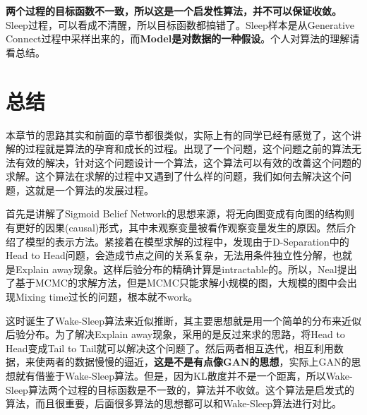 \documentclass[a4paper]{article}
\begin{document}
\textbf{两个过程的目标函数不一致，所以这是一个启发性算法，并不可以保证收敛。}Sleep过程，可以看成不清醒，所以目标函数都搞错了。Sleep样本是从Generative Connect过程中采样出来的，而\textbf{Model是对数据的一种假设}。个人对算法的理解请看总结。


\section{总结}
本章节的思路其实和前面的章节都很类似，实际上有的同学已经有感觉了，这个讲解的过程就是算法的孕育和成长的过程。出现了一个问题，这个问题之前的算法无法有效的解决，针对这个问题设计一个算法，这个算法可以有效的改善这个问题的求解。这个算法在求解的过程中又遇到了什么样的问题，我们如何去解决这个问题，这就是一个算法的发展过程。

首先是讲解了Sigmoid Belief Network的思想来源，将无向图变成有向图的结构则有更好的因果(causal)形式，其中未观察变量被看作观察变量发生的原因。然后介绍了模型的表示方法。紧接着在模型求解的过程中，发现由于D-Separation中的Head to Head问题，会造成节点之间的关系复杂，无法用条件独立性分解，也就是Explain away现象。这样后验分布的精确计算是intractable的。所以，Neal提出了基于MCMC的求解方法，但是MCMC只能求解小规模的图，大规模的图中会出现Mixing time过长的问题，根本就不work。

这时诞生了Wake-Sleep算法来近似推断，其主要思想就是用一个简单的分布来近似后验分布。为了解决Explain away现象，采用的是反过来求的思路，将Head to Head变成Tail to Tail就可以解决这个问题了。然后两者相互迭代，相互利用数据，来使两者的数据慢慢的逼近，\textbf{这是不是有点像GAN的思想}，实际上GAN的思想就有借鉴于Wake-Sleep算法。但是，因为KL散度并不是一个距离，所以Wake-Sleep算法两个过程的目标函数是不一致的，算法并不收敛。这个算法是启发式的算法，而且很重要，后面很多算法的思想都可以和Wake-Sleep算法进行对比。
\end{document}

